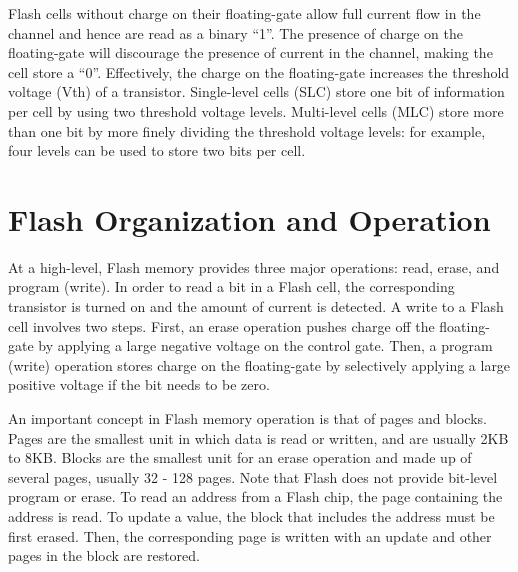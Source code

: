 Flash cells without charge on their floating-gate allow full
current flow in the channel and hence are read as a binary ``1''.
The presence of charge on the floating-gate will discourage the
presence of current in the channel, making the cell store a ``0''.
Effectively, the charge on the floating-gate increases the
threshold voltage (Vth) of a transistor. Single-level cells (SLC)
store one bit of information per cell by using two threshold
voltage levels.
Multi-level cells (MLC) store more than one bit by more finely
dividing the threshold voltage levels: for example, four levels 
can be used to store two bits per cell.


\section{Flash Organization and Operation}

At a high-level, Flash memory provides three major operations:
read, erase, and program (write). In order to read a bit in a
Flash cell, the corresponding transistor is turned on and the
amount of current is detected. A write to a Flash cell involves
two steps. First, an erase operation pushes charge off the
floating-gate by applying a large negative voltage on the
control gate. Then, a program (write) operation stores charge on
the floating-gate by selectively applying a large positive
voltage if the bit needs to be zero.

An important concept in Flash memory operation is that of pages
and blocks. Pages are the smallest unit in which data is read or
written, and are usually 2KB to 8KB. Blocks are the smallest
unit for an erase operation and made up of several pages,
usually 32 - 128 pages. Note that Flash does not provide
bit-level program or erase. To read an address from a Flash
chip, the page containing the address is read. To update a
value, the block that includes the address must be first erased.
Then, the corresponding page is written with an update and other
pages in the block are restored.

